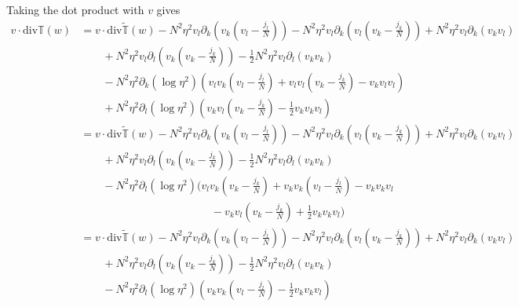 \documentclass[a4paper]{article}
\renewcommand{\div}{\mathrm{div}}
\begin{document}
Taking the dot product with $v$ gives
\begin{align}
  v \cdot \div \mathbb{T}(w) &= v \cdot \div \tilde{\mathbb{T}}(w) - N^2 \eta^2 v_l \partial_k \left( v_k \left( v_l - \frac{j_l}{N} \right) \right) -
  N^2 \eta^2 v_l \partial_k \left( v_l \left( v_k - \frac{j_k}{N} \right) \right) + N^2 \eta^2 v_l \partial_k (v_k v_l) \nonumber \\
  &\quad \quad + N^2 \eta^2 v_l \partial_l \left( v_k \left( v_k - \frac{j_k}{N} \right) \right) - \frac{1}{2} N^2 \eta^2 v_l \partial_l (v_k v_k)
  \nonumber \\
  &\quad \quad - N^2 \eta^2 \partial_k( \log \eta^2 ) \left( v_l v_k \left( v_l - \frac{j_l}{N} \right) + v_l v_l \left( v_k - \frac{j_k}{N} \right) -
  v_k v_l v_l \right) \nonumber \\
  &\quad \quad + N^2 \eta^2 \partial_l (\log \eta^2) \left( v_k v_l \left( v_k - \frac{j_k}{N} \right) - \frac{1}{2} v_k v_k v_l \right) \nonumber \\
  &= v \cdot \div \tilde{\mathbb{T}}(w) - N^2 \eta^2 v_l \partial_k \left( v_k \left( v_l - \frac{j_l}{N} \right) \right) -
  N^2 \eta^2 v_l \partial_k \left( v_l \left( v_k - \frac{j_k}{N} \right) \right) + N^2 \eta^2 v_l \partial_k (v_k v_l) \nonumber \\
  &\quad \quad + N^2 \eta^2 v_l \partial_l \left( v_k \left( v_k - \frac{j_k}{N} \right) \right) - \frac{1}{2} N^2 \eta^2 v_l \partial_l (v_k v_k)
  \nonumber \\
  &\quad \quad - N^2 \eta^2 \partial_l (\log \eta^2) \bigg( v_l v_k \left( v_k - \frac{j_k}{N} \right) + v_k v_k \left( v_l - \frac{j_l}{N} \right) -
  v_k v_k v_l \nonumber \\
  &\hspace{5cm} - v_k v_l \left( v_k - \frac{j_k}{N} \right) + \frac{1}{2} v_k v_k v_l \bigg) \nonumber \\
  &= v \cdot \div \tilde{\mathbb{T}}(w) - N^2 \eta^2 v_l \partial_k \left( v_k \left( v_l - \frac{j_l}{N} \right) \right) -
  N^2 \eta^2 v_l \partial_k \left( v_l \left( v_k - \frac{j_k}{N} \right) \right) + N^2 \eta^2 v_l \partial_k (v_k v_l) \nonumber \\
  &\quad \quad + N^2 \eta^2 v_l \partial_l \left( v_k \left( v_k - \frac{j_k}{N} \right) \right) - \frac{1}{2} N^2 \eta^2 v_l \partial_l (v_k v_k)
  \nonumber \\
  &\quad \quad - N^2 \eta^2 \partial_l (\log \eta^2) \left( v_k v_k \left( v_l - \frac{j_l}{N} \right) - \frac{1}{2} v_k v_k v_l \right)
  \label{eq:v_div_T}
\end{align}
\end{document}
